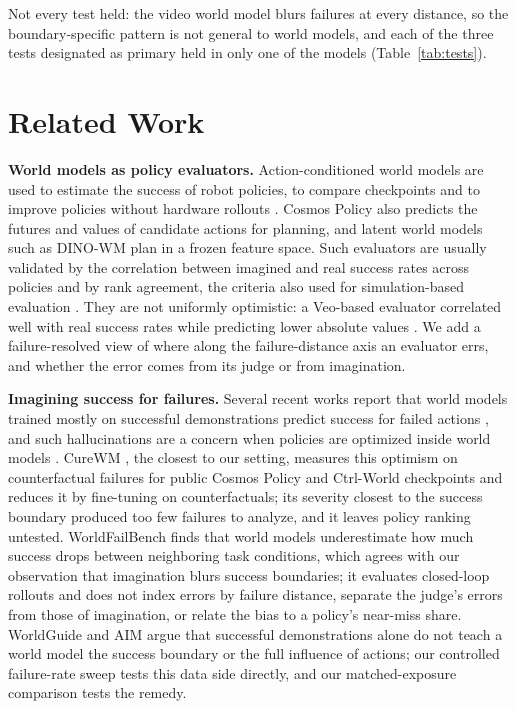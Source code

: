 \documentclass[10pt]{article}
\begin{document}
Not every test held: the video world model blurs failures at every distance, so the boundary-specific pattern is not general to world models, and each of the three tests designated as primary held in only one of the models (Table~\ref{tab:tests}).

\section{Related Work}
\label{sec:related}

\textbf{World models as policy evaluators.} Action-conditioned world models are used to estimate the success of robot policies, to compare checkpoints and to improve policies without hardware rollouts \citep{quevedo2026worldgym, li2025worldeval, guo2026ctrlworld, gao2026dreamdojo, jeon2026roboworld}. Cosmos Policy \citep{kim2026cosmospolicy} also predicts the futures and values of candidate actions for planning, and latent world models such as DINO-WM \citep{zhou2025dinowm} plan in a frozen feature space. Such evaluators are usually validated by the correlation between imagined and real success rates across policies and by rank agreement, the criteria also used for simulation-based evaluation \citep{li2024simpler}. They are not uniformly optimistic: a Veo-based evaluator correlated well with real success rates while predicting lower absolute values \citep{geminirobotics2025veo}. We add a failure-resolved view of where along the failure-distance axis an evaluator errs, and whether the error comes from its judge or from imagination.

\textbf{Imagining success for failures.} Several recent works report that world models trained mostly on successful demonstrations predict success for failed actions \citep{yang2026mirabench, liu2026worldvlaloop, peng2026fact, li2026dreamtrue, tu2026hfwm, wang2026proworld}, and such hallucinations are a concern when policies are optimized inside world models \citep{zhu2026wmpo, chen2026hawmpo, zhou2026wovrplus}. CureWM \citep{xu2026curewm}, the closest to our setting, measures this optimism on counterfactual failures for public Cosmos Policy and Ctrl-World checkpoints and reduces it by fine-tuning on counterfactuals; its severity closest to the success boundary produced too few failures to analyze, and it leaves policy ranking untested. WorldFailBench \citep{zhang2026worldfailbench} finds that world models underestimate how much success drops between neighboring task conditions, which agrees with our observation that imagination blurs success boundaries; it evaluates closed-loop rollouts and does not index errors by failure distance, separate the judge's errors from those of imagination, or relate the bias to a policy's near-miss share. WorldGuide \citep{liu2026worldguide} and AIM \citep{bateman2026aim} argue that successful demonstrations alone do not teach a world model the success boundary or the full influence of actions; our controlled failure-rate sweep tests this data side directly, and our matched-exposure comparison tests the remedy.
\end{document}
